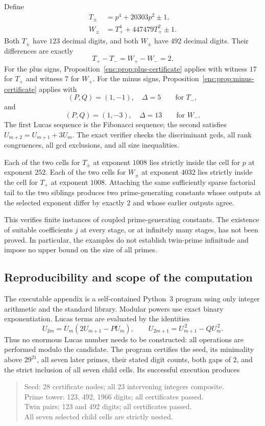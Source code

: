 \documentclass[11pt,a4paper]{article}
\theoremstyle{definition}
\theoremstyle{remark}
\numberwithin{equation}{section}
\begin{document}
Define
\begin{align*}
T_\pm&=p^4+20303p^2\pm1,\\
W_\pm&=T_+^4+447479T_+^2\pm1.
\end{align*}
Both $T_\pm$ have $123$ decimal digits, and both $W_\pm$ have $492$ decimal
digits.  Their differences are exactly
\[
T_+-T_-=W_+-W_-=2.
\]
For the plus signs, Proposition~\ref{enc:prop:plus-certificate} applies with
witness $17$ for $T_+$ and witness $7$ for $W_+$.
For the minus signs, Proposition~\ref{enc:prop:minus-certificate} applies with
\[
(P,Q)=(1,-1),\quad\Delta=5\qquad\text{for }T_-,
\]
and
\[
(P,Q)=(1,-3),\quad\Delta=13\qquad\text{for }W_-.
\]
The first Lucas sequence is the Fibonacci sequence; the second satisfies
$U_{m+2}=U_{m+1}+3U_m$.  The exact verifier checks the discriminant gcds,
all rank congruences, all gcd exclusions, and all size inequalities.

Each of the two cells for $T_\pm$ at exponent $1008$ lies strictly inside
the cell for $p$ at exponent $252$.  Each of the two cells for $W_\pm$ at
exponent $4032$ lies strictly inside the cell for $T_+$ at exponent $1008$.
Attaching the same sufficiently sparse factorial tail to the two siblings
produces two prime-generating constants whose outputs at the selected
exponent differ by exactly $2$ and whose earlier outputs agree.

This verifies finite instances of coupled prime-generating constants.
The existence of suitable coefficients $j$ at every stage, or at
infinitely many stages, has not been proved.  In particular, the examples
do not establish twin-prime infinitude and impose no upper bound on the
size of all primes.

\subsection{Reproducibility and scope of the computation}

The executable appendix is a self-contained Python~3 program using only
integer arithmetic and the standard library.  Modular powers use exact
binary exponentiation.  Lucas terms are evaluated by the identities
\[
U_{2m}=U_m(2U_{m+1}-P U_m),\qquad
U_{2m+1}=U_{m+1}^{\,2}-Q U_m^{\,2}.
\]
Thus no enormous Lucas number needs to be constructed: all operations are
performed modulo the candidate.  The program certifies the seed, its
minimality above $29^{21}$, all seven later primes, their stated digit
counts, both gaps of $2$, and the strict inclusion of all seven child
cells.  Its successful execution produces
\begin{quote}\ttfamily\small
Seed: 28 certificate nodes; all 23 intervening integers composite.\\
Prime tower: 123, 492, 1966 digits; all certificates passed.\\
Twin pairs: 123 and 492 digits; all certificates passed.\\
All seven selected child cells are strictly nested.
\end{quote}
\end{document}
